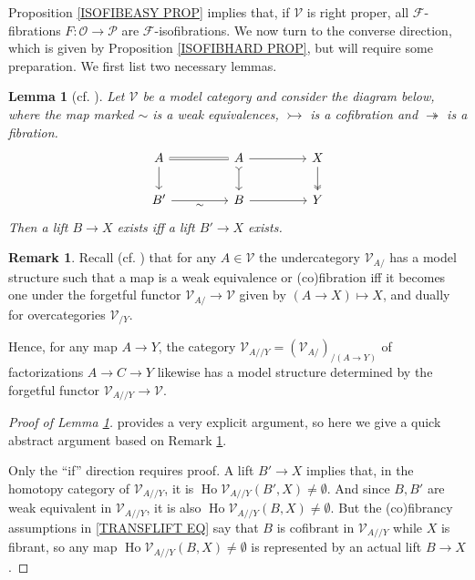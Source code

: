 \documentclass[a4paper,10pt
,draft
]{article}%
\numberwithin{equation}{section}
\numberwithin{figure}{section}
\newtheorem{lemma}[equation]{Lemma}%
\theoremstyle{definition} %
\newtheorem{remark}[equation]{Remark}%
\DeclareMathOperator{\Ho}{Ho}
\newcommand{\F}{\ensuremath{\mathcal F}}
\newcommand{\V}{\ensuremath{\mathcal V}}
\newcommand{\1}{\ensuremath{\mathbbm 1}}%
\begin{document}
Proposition \ref{ISOFIBEASY PROP}
implies that, if $\V$ is right proper,
all $\F$-fibrations $F \colon \mathcal{O} \to \mathcal{P}$ are $\F$-isofibrations.
%
We now turn to the converse direction, which
is given by Proposition \ref{ISOFIBHARD PROP}, 
but will require some preparation.
We first list two necessary lemmas.



\begin{lemma}[{cf. \cite[Lemma 2.6]{Ber07b}}]
	\label{TRANSFLIFT LEMMA}
	Let $\V$ be a model category and consider the diagram below, 
	where the map marked $\sim$ is a weak equivalences, 
	$\rightarrowtail$ is a cofibration
	and $\twoheadrightarrow$ is a fibration.
\begin{equation}\label{TRANSFLIFT EQ}
\begin{tikzcd}[column sep = 45pt]
	A
	\ar{d}
	\arrow[equal]{r}
&
	A \ar{r}
	\arrow[rightarrowtail]{d}
&
	X \arrow[twoheadrightarrow]{d}
\\
	B'
	\arrow{r}[swap]{\sim}
&
	B\ar{r}
&
	Y
\end{tikzcd}
\end{equation}
Then a lift $B \to X$ %
exists iff
a lift $B' \to X$ %
exists.
\end{lemma}


\begin{remark}\label{UNDEROVER REM}
	Recall (cf. \cite[Rem. 3.10]{DS95})
	that for any $A \in \V$ the undercategory $\V_{A/}$
	has a model structure such that a map is a 
	weak equivalence or (co)fibration iff it becomes one under the 
	forgetful functor
	$\V_{A/} \to \V$ given by $(A \to X) \mapsto X$,
	and dually for overcategories $\V_{/Y}$.
	
	Hence, for any map $A \to Y$,
	the category 
	$\V_{A//Y} = \left(\V_{A/}\right)_{/(A\to Y)}$
	of factorizations $A \to C \to Y$
	likewise has a model structure determined by the forgetful functor
	$\V_{A//Y} \to \V$.
\end{remark}


\begin{proof}[Proof of Lemma \ref{TRANSFLIFT LEMMA}]
	\cite{Ber07b} provides a very explicit argument, so here we give a quick abstract argument based on Remark \ref{UNDEROVER REM}.
	
	Only the ``if'' direction requires proof.
	A lift $B' \to X$ implies that,
	in the homotopy category of $\V_{A//Y}$, it is
	$\Ho \V_{A//Y}(B',X) \neq \emptyset$. 
	And since $B,B'$ are weak equivalent in 
	$\V_{A//Y}$, it is also 
	$\Ho \V_{A//Y}(B,X) \neq \emptyset$.
	But the (co)fibrancy assumptions in \eqref{TRANSFLIFT EQ}
	say that $B$ is cofibrant in $\V_{A//Y}$ while 
	$X$ is fibrant, so any map $\Ho \V_{A//Y}(B,X) \neq \emptyset$
	is represented by an actual lift $B \to X$.
\end{proof}
\end{document}
